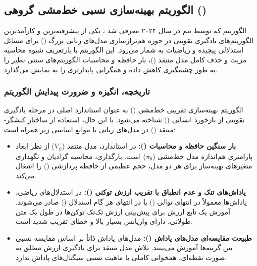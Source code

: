 \subsection{الگوریتم بهینه‌سازی نسبی خط‌مشی گروهی ()}

الگوریتم  که توسط تیم  در سال ۲۰۲۴ معرفی شد \cite{shao2024deepseekmath}، یکی از پیشرفته‌ترین و کارآمدترین الگوریتم‌های یادگیری تقویتی در حوزه هم‌ترازسازی مدل‌های زبانی بزرگ () برای مسائل استدلالی پیچیده و ریاضیات به شمار می‌رود. این الگوریتم با بازتعریف شیوه محاسبه مزیت و حذف کامل مدل منتقد ()، بار حافظه و محاسبات الگوریتم‌های سنتی نظیر  را به طور چشمگیری کاهش داده و همگرایی پایدارتری را به نمایش می‌گذارد.

\subsubsection*{تاریخچه، انگیزه و ضرورت پیدایش الگوریتم}

الگوریتم بهینه‌سازی تقریبی خط‌مشی () \cite{schulman2017proximal} به عنوان استاندارد اصلی در مرحله یادگیری تقویتی از بازخورد انسانی () \cite{ouyang2022training} شناخته می‌شود. با این حال، استفاده از ساختار کنشگر-منتقد () در مدل‌های زبانی با موانع اساسی زیر همراه است:

\begin{itemize}
    \item \textbf{بار سنگین حافظه و محاسبات ():} در  استاندارد، مدل منتقد ($V_\psi$) از نظر ابعاد پارامتری هم‌اندازه مدل خط‌مشی ($\pi_\theta$) است. بارگذاری، محاسبه گرادیان و نگهداری متغیرهای بهینه‌ساز برای هر دو مدل، حجم عظیمی از حافظه پردازشی () را اشغال می‌کند.
    \item \textbf{پاداش‌های تنک و عدم انطباق با تقریب ارزش توکنی ():} در استدلال‌های ریاضی، پاداش‌ها معمولاً در انتهای توالی () یا در انتهای هر گام استدلال () صادر می‌شوند. آموزش یک تابع ارزش برای پیش‌بینی ارزش تک‌تک توکن‌ها در طول یک متن طولانی، دارای واریانس بسیار بالا و خطای تقریب شدید است.
    \item \textbf{طبیعت مقایسه‌ای مدل‌های پاداش ():} مدل‌های پاداش ذاتاً بر اساس مقایسه نسبی بین گزینه‌ها آموزش می‌بینند. تلاش مدل منتقد برای یادگیری ارزش مطلق به صورت نقطه‌ای، همخوانی کاملی با ماهیت نسبی سیگنال‌های پاداش ندارد.
\end{itemize}

